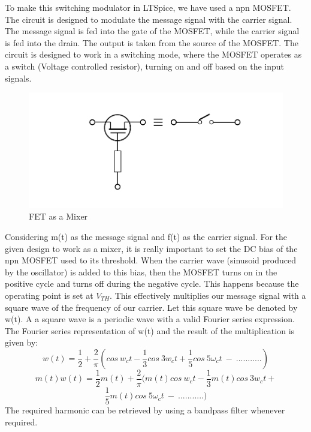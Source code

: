 \documentclass[conference]{IEEEtran}
\begin{document}
To make this switching modulator in LTSpice, we have used a npn MOSFET. The circuit is designed to modulate the message signal with the carrier signal. The message signal is fed into the gate of the MOSFET, while the carrier signal is fed into the drain. The output is taken from the source of the MOSFET. The circuit is designed to work in a switching mode, where the MOSFET operates as a switch (Voltage controlled resistor), turning on and off based on the input signals.

\begin{figure}
    \centering
    \includegraphics[width=1\linewidth]{Images/FET_mixer.png}
    \caption{FET as a Mixer}
\end{figure}


Considering m(t) as the message signal and f(t) as the carrier signal. For the given design to work as a mixer, it is really important to set the DC bias of the npn MOSFET used to its threshold. When the carrier wave (sinusoid produced by the oscillator) is added to this bias, then the MOSFET turns on in the positive cycle and turns off during the negative cycle. This happens because the operating point is set at $V_{TH}$. This effectively multiplies our message signal with a square wave of the frequency of our carrier. Let this square wave be denoted by w(t). A a square wave is a periodic wave with a valid Fourier series expression. The Fourier series representation of w(t) and the result of the multiplication is given by:
$$w(t) = \frac{1}{2} + \frac{2}{\pi}(cos\ w_ct - \frac{1}{3}cos\ 3w_ct + \frac{1}{5}cos\ 5\omega_ct\ -\ ...........)$$
$$m(t)w(t) = \frac{1}{2}m(t) + \frac{2}{\pi}(m(t)cos\ w_ct - \frac{1}{3}m(t)cos\ 3w_ct +$$ $$\frac{1}{5}m(t)cos\ 5\omega_ct\ -\ ...........)$$
The required harmonic can be retrieved by using a bandpass filter whenever required.
\end{document}
